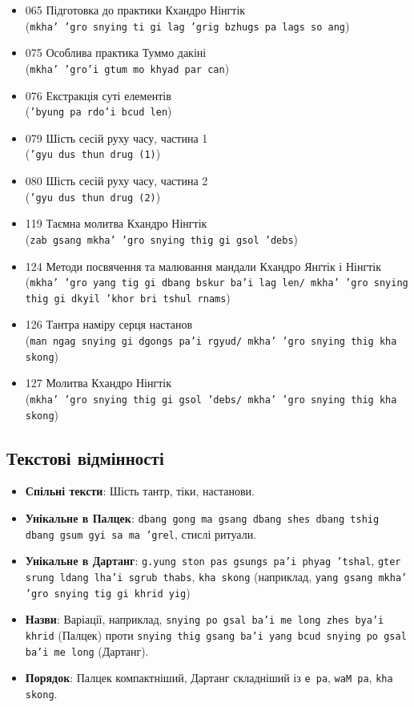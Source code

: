 \documentclass{article}
\begin{document}
\begingroup\raggedright
\begin{itemize}
\item 065 Підготовка до практики Кхандро Нінгтік \\ (\texttt{mkha' 'gro snying ti gi lag 'grig bzhugs pa lags so ang})
\item 075 Особлива практика Туммо дакіні \\ (\texttt{mkha' 'gro'i gtum mo khyad par can})
\item 076 Екстракція суті елементів \\ (\texttt{'byung pa rdo'i bcud len})
\item 079 Шість сесій руху часу, частина 1 \\ (\texttt{'gyu dus thun drug (1)})
\item 080 Шість сесій руху часу, частина 2 \\ (\texttt{'gyu dus thun drug (2)})
\item 119 Таємна молитва Кхандро Нінгтік \\ (\texttt{zab gsang mkha' 'gro snying thig gi gsol 'debs})
\item 124 Методи посвячення та малювання мандали Кхандро Янґтік і Нінгтік \\ (\texttt{mkha' 'gro yang tig gi dbang bskur ba'i lag len/ mkha' 'gro snying thig gi dkyil 'khor bri tshul rnams})
\item 126 Тантра наміру серця настанов \\ (\texttt{man ngag snying gi dgongs pa'i rgyud/ mkha' 'gro snying thig kha skong})
\item 127 Молитва Кхандро Нінгтік \\ (\texttt{mkha' 'gro snying thig gi gsol 'debs/ mkha' 'gro snying thig kha skong})
\end{itemize}
\endgroup

\newpage
\subsection{Текстові відмінності}

\begingroup\raggedright
\begin{itemize}
    \item \textbf{Спільні тексти}: Шість тантр, тіки, настанови.
    \item \textbf{Унікальне в Палцек}: \texttt{dbang gong ma gsang dbang shes dbang tshig dbang gsum gyi sa ma 'grel}, стислі ритуали.
    \item \textbf{Унікальне в Дартанг}: \texttt{g.yung ston pas gsungs pa'i phyag 'tshal}, \texttt{gter srung ldang lha'i sgrub thabs}, \texttt{kha skong} (наприклад, \texttt{yang gsang mkha' 'gro snying tig gi khrid yig})
    \item \textbf{Назви}: Варіації, наприклад, \texttt{snying po gsal ba'i me long zhes bya'i khrid} (Палцек) проти \texttt{snying thig gsang ba'i yang bcud snying po gsal ba'i me long} (Дартанг).
    \item \textbf{Порядок}: Палцек компактніший, Дартанг складніший із \texttt{e pa}, \texttt{waM pa}, \texttt{kha skong}.
\end{itemize}
\endgroup
\end{document}
